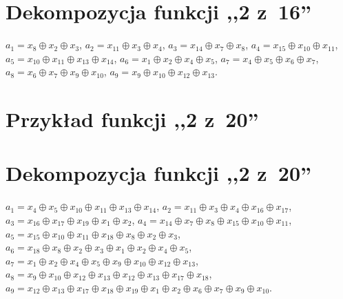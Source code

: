 \section*{Dekompozycja funkcji ,,2 z~16''}
\label{file:2outof16.txt}
\noindent
$a_1 = x_8 \oplus x_2 \oplus x_3$, \newline
$a_2 = x_{11} \oplus x_3 \oplus x_4$, \newline
$a_3 = x_{14} \oplus x_7 \oplus x_8$, \newline
$a_4 = x_{15} \oplus x_{10} \oplus x_{11}$, \newline
$a_5 = x_{10} \oplus x_{11} \oplus x_{13} \oplus x_{14}$, \newline
$a_6 = x_1 \oplus x_2 \oplus x_4 \oplus x_5$, \newline
$a_7 = x_4 \oplus x_5 \oplus x_6 \oplus x_7$, \newline
$a_8 = x_6 \oplus x_7 \oplus x_9 \oplus x_{10}$, \newline
$a_9 = x_9 \oplus x_{10} \oplus x_{12} \oplus x_{13}$. \newline

\clearpage

\section*{Przykład funkcji ,,2 z~20''}
\label{file:2outof20.pla}

\clearpage

\section*{Dekompozycja funkcji ,,2 z~20''}
\label{file:2outof20.txt}
\noindent
$a_1 = x_{4} \oplus x_{5} \oplus x_{10} \oplus x_{11} \oplus x_{13} \oplus x_{14}$, \newline
$a_2 = x_{11} \oplus x_{3} \oplus x_{4} \oplus x_{16} \oplus x_{17}$, \newline
$a_3 = x_{16} \oplus x_{17} \oplus x_{19} \oplus x_{1} \oplus x_{2}$, \newline
$a_4 = x_{14} \oplus x_{7} \oplus x_{8} \oplus x_{15} \oplus x_{10} \oplus x_{11}$, \newline
$a_5 = x_{15} \oplus x_{10} \oplus x_{11} \oplus x_{18} \oplus x_{8} \oplus x_{2} \oplus x_{3}$, \newline
$a_6 = x_{18} \oplus x_{8} \oplus x_{2} \oplus x_{3} \oplus x_{1} \oplus x_{2} \oplus x_{4} \oplus x_{5}$, \newline
$a_7 = x_{1} \oplus x_{2} \oplus x_{4} \oplus x_{5} \oplus x_{9} \oplus x_{10} \oplus x_{12} \oplus x_{13}$, \newline
$a_8 = x_{9} \oplus x_{10} \oplus x_{12} \oplus x_{13} \oplus x_{12} \oplus x_{13} \oplus x_{17} \oplus x_{18}$, \newline
$a_9 = x_{12} \oplus x_{13} \oplus x_{17} \oplus x_{18} \oplus x_{19} \oplus x_{1} \oplus x_{2} \oplus x_{6} \oplus x_{7} \oplus x_{9} \oplus x_{10}$. \newline

\clearpage